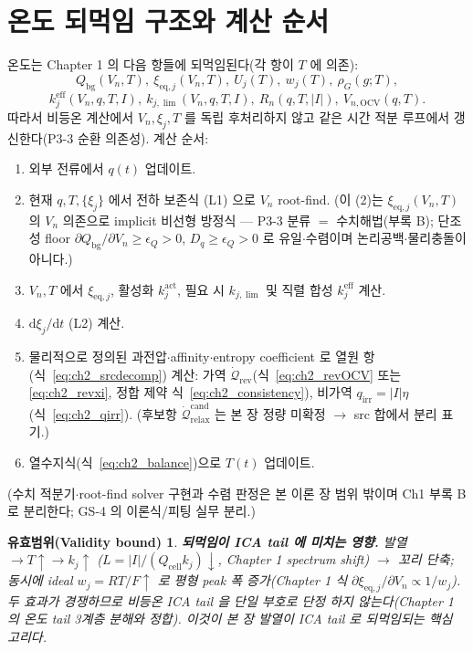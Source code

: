\documentclass[11pt,a4paper]{article}
\newtheorem*{boundbox}{유효범위(Validity bound)}
\newcommand{\dd}{\mathrm{d}}
\newcommand{\eff}{\mathrm{eff}}
\newcommand{\eq}{\mathrm{eq}}
\newcommand{\bg}{\mathrm{bg}}
\newcommand{\cell}{\mathrm{cell}}
\newcommand{\OCV}{\mathrm{OCV}}
\newcommand{\irr}{\mathrm{irr}}
\newcommand{\rev}{\mathrm{rev}}
\newcommand{\rlx}{\mathrm{relax}}
\newcommand{\cand}{\mathrm{cand}}
\begin{document}
\section{온도 되먹임 구조와 계산 순서}\label{sec:ch2_feedback}
온도는 Chapter 1 의 다음 항들에 되먹임된다(각 항이 $T$ 에 의존):
\begin{equation}
Q_\bg(V_n,T),\ \xi_{\eq,j}(V_n,T),\ U_j(T),\ w_j(T),\ \rho_G(g;T),
\label{eq:ch2_feedT1}
\end{equation}
\begin{equation}
k_j^{\eff}(V_n,q,T,I),\ k_{j,\lim}(V_n,q,T,I),\ R_n(q,T,|I|),\ V_{n,\OCV}(q,T).
\label{eq:ch2_feedT2}
\end{equation}
따라서 비등온 계산에서 $V_n,\xi_j,T$ 를 독립 후처리하지 않고 같은 시간 적분 루프에서 갱신한다(P3-3 순환
의존성). 계산 순서:
\begin{enumerate}[label=\arabic*),leftmargin=2.0em]
\item 외부 전류에서 $q(t)$ 업데이트.
\item 현재 $q,T,\{\xi_j\}$ 에서 전하 보존식 (L1) 으로 $V_n$ root-find.
  (이 (2)는 $\xi_{\eq,j}(V_n,T)$ 의 $V_n$ 의존으로 implicit 비선형 방정식 — P3-3 분류 $=$ 수치해법(부록 B);
  단조성 floor $\partial Q_\bg/\partial V_n\ge\epsilon_Q>0$, $D_q\ge\epsilon_Q>0$ 로 유일$\cdot$수렴이며 논리공백$\cdot$물리충돌이 아니다.)
\item $V_n,T$ 에서 $\xi_{\eq,j}$, 활성화 $k_j^{\mathrm{act}}$, 필요 시 $k_{j,\lim}$ 및 직렬 합성 $k_j^{\eff}$ 계산.
\item $\dd\xi_j/\dd t$ (L2) 계산.
\item 물리적으로 정의된 과전압$\cdot$affinity$\cdot$entropy coefficient 로 열원 항(식~\eqref{eq:ch2_srcdecomp}) 계산:
  가역 $\dot{\mathcal Q}_{\rev}$(식~\eqref{eq:ch2_revOCV} 또는 \eqref{eq:ch2_revxi}, 정합 제약 식~\eqref{eq:ch2_consistency}),
  비가역 $q_\irr=|I|\eta$(식~\eqref{eq:ch2_qirr}). (후보항 $\dot{\mathcal Q}_{\rlx}^{\cand}$ 는 본 장 정량 미확정 $\to$ src 합에서 분리 표기.)
\item 열수지식(식~\eqref{eq:ch2_balance})으로 $T(t)$ 업데이트.
\end{enumerate}
(수치 적분기$\cdot$root-find solver 구현과 수렴 판정은 본 이론 장 범위 밖이며 Ch1 부록 B 로 분리한다; GS-4 의
이론식/피팅 실무 분리.)
\begin{boundbox}
\textbf{되먹임이 ICA tail 에 미치는 영향.} 발열 $\to T\uparrow\to k_j\uparrow$ ($L=|I|/(Q_\cell k_j)\downarrow$,
Chapter 1 spectrum shift) $\to$ 꼬리 단축; 동시에 ideal $w_j=RT/F\uparrow$ 로 평형 peak 폭 증가(Chapter 1
식 $\partial\xi_{\eq,j}/\partial V_n\propto1/w_j$). 두 효과가 경쟁하므로 비등온 ICA tail 을 단일 부호로 단정
하지 않는다(Chapter 1 의 온도 tail 3계층 분해와 정합). 이것이 본 장 발열이 ICA tail 로 되먹임되는 핵심 고리다.
\end{boundbox}
\end{document}

